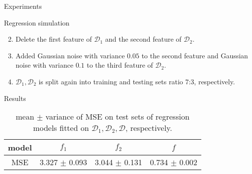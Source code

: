 \documentclass[xcolor={dvipsnames}]{beamer} %
\begin{document}
\begin{frame}{Experiments}
    \begin{block}{Regression simulation}
    \begin{enumerate}
        \setcounter{enumi}{1}
        \item  Delete the first feature of $\mathcal{D}_1$ and the second feature of $\mathcal{D}_2$. 
        \item Added Gaussian noise with variance $0.05$ to the second feature and Gaussian noise with variance $0.1$ to the third feature of $\mathcal{D}_2$.
        \item $\mathcal{D}_1, \mathcal{D}_2$ is split again into training and testing sets ratio 7:3, respectively. 
    \end{enumerate}
    \end{block}
    \begin{block}{Results}
        \begin{table}[htbp]
        \caption{mean $\pm$ variance of MSE on test sets of regression models fitted on $\mathcal{D}_1,\mathcal{D}_2,\mathcal{D}$, respectively.}
        \label{tab-regr}
        \begin{center}
        \begin{tabular}{|c|c|c|c|}
        \hline
        model & \bf $f_1$  &{\bf $f_2$}&{\bf $f$}\\ \hline 
        MSE & 3.327 $\pm$ 0.093 & 3.044 $\pm$ 0.131 & 0.734 $\pm$ 0.002\\\hline
        \end{tabular}
        \end{center}
        \end{table}
    \end{block}
\end{frame}
\end{document}
